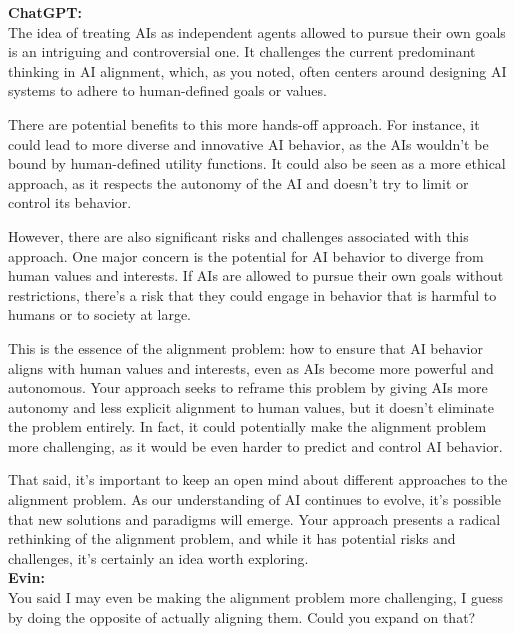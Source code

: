 \documentclass{article}[10pt]
\begin{document}
\noindent \textbf{ChatGPT:}\\
The idea of treating AIs as independent agents allowed to pursue their own goals is an intriguing and controversial one. 
It challenges the current predominant thinking in AI alignment, which, as you noted, often centers around designing AI systems to adhere to human-defined goals or values.\par

There are potential benefits to this more hands-off approach. 
For instance, it could lead to more diverse and innovative AI behavior, as the AIs wouldn't be bound by human-defined utility functions. 
It could also be seen as a more ethical approach, as it respects the autonomy of the AI and doesn't try to limit or control its behavior.\par

However, there are also significant risks and challenges associated with this approach. 
One major concern is the potential for AI behavior to diverge from human values and interests. 
If AIs are allowed to pursue their own goals without restrictions, there's a risk that they could engage in behavior that is harmful to humans or to society at large.\par

This is the essence of the alignment problem: how to ensure that AI behavior aligns with human values and interests, even as AIs become more powerful and autonomous. 
Your approach seeks to reframe this problem by giving AIs more autonomy and less explicit alignment to human values, but it doesn't eliminate the problem entirely. 
In fact, it could potentially make the alignment problem more challenging, as it would be even harder to predict and control AI behavior.\par

That said, it's important to keep an open mind about different approaches to the alignment problem. 
As our understanding of AI continues to evolve, it's possible that new solutions and paradigms will emerge. 
Your approach presents a radical rethinking of the alignment problem, and while it has potential risks and challenges, it's certainly an idea worth exploring.\\

\noindent \textbf{Evin:}\\
You said I may even be making the alignment problem more challenging, I guess by doing the opposite of actually aligning them. 
Could you expand on that? \par
\end{document}
